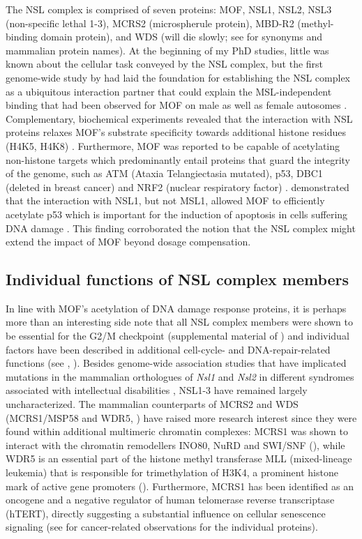 The NSL complex is comprised of seven proteins: MOF, NSL1, NSL2, NSL3 (non-specific lethal 1-3), MCRS2 (microspherule protein), MBD-R2 (methyl-binding domain protein), and WDS (will die slowly; see  for synonyms and mammalian protein names). At the beginning of my PhD studies, little was known about the cellular task conveyed by the NSL complex, but the first genome-wide study by \citet{Raja2010} had laid the foundation for establishing the NSL complex as a ubiquitous interaction partner that could explain the MSL-independent binding that had been observed for MOF on male as well as female autosomes \citep{Bhadra1999, Kind2008, Raja2010}. Complementary, biochemical experiments revealed that the interaction with NSL proteins relaxes MOF’s substrate specificity towards additional histone residues (H4K5, H4K8) \citep{Cai2010}. Furthermore, MOF was reported to be capable of acetylating non-histone targets which predominantly entail proteins that guard the integrity of the genome, such as ATM (Ataxia Telangiectasia mutated), p53, DBC1 (deleted in breast cancer) and NRF2 (nuclear respiratory factor) \citep{Gupta2005, Sykes2006, Zheng2013, Chen2014}. \citet{Li2009} demonstrated that the interaction with NSL1, but not MSL1, allowed MOF to efficiently acetylate p53 which is important for the induction of apoptosis in cells suffering DNA damage \citep{Sykes2006, Sykes2009}. This finding corroborated the notion that the NSL complex might extend the impact of MOF beyond dosage compensation.
%
\subsection{Individual functions of NSL complex members}
In line with MOF’s acetylation of DNA damage response proteins, it is perhaps more than an interesting side note that all NSL complex members were shown to be essential for the G2/M checkpoint (supplemental material of \citet{Kondo2011}) and individual factors have been described in additional cell-cycle- and DNA-repair-related functions (see , ). Besides genome-wide association studies that have implicated mutations in the mammalian orthologues of \textit{Nsl1} and \textit{Nsl2} in different syndromes associated with intellectual disabilities \citep{Itsara2012, Koolen2012, Zollino2012, Gilissen2014}, NSL1-3 have remained largely uncharacterized. The mammalian counterparts of MCRS2 and WDS (MCRS1/MSP58 and WDR5, ) have raised more research interest since they were found within additional multimeric chromatin complexes: MCRS1 was shown to interact with the chromatin remodellers INO80, NuRD and SWI/SNF \citep{Jin2005, Shimono2005, Hsu2012} (), while WDR5 is an essential part of the histone methyl transferase MLL \citep{Trievel2009} (mixed-lineage leukemia) that is responsible for trimethylation of H3K4, a prominent histone mark of active gene promoters (). Furthermore, MCRS1 has been identified as an oncogene and a negative regulator of human telomerase reverse transcriptase (hTERT), directly suggesting a substantial influence on cellular senescence signaling \citep{Hsu2012,Hsu2014} (see  for cancer-related observations for the individual proteins).


